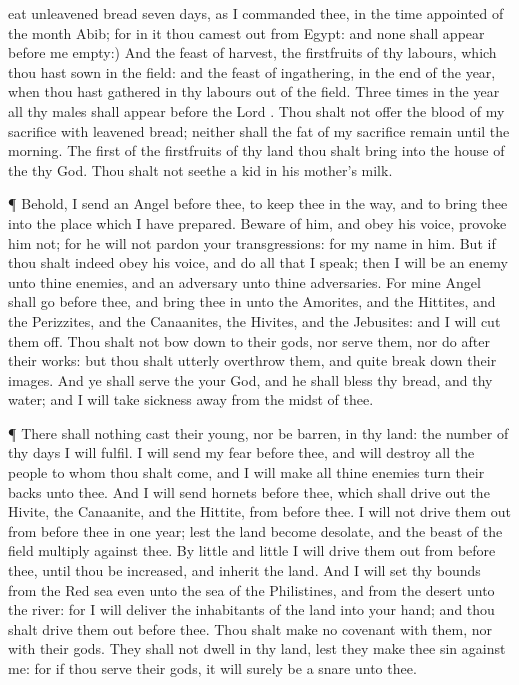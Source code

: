 {eat unleavened
bread
seven
days, as I
commanded thee, in the time
appointed of the
month
Abib; for in it thou camest
out from
Egypt: and none shall
appear
before me
empty:)
And the
feast of
harvest, the
firstfruits of thy
labours, which thou hast
sown in the
field: and the
feast of
ingathering,
{} in the
end of the
year, when thou hast
gathered in thy
labours out of the
field.
Three
times in the
year all thy
males shall
appear
before the
Lord
{}.
Thou shalt not
offer the
blood of my
sacrifice with leavened
bread; neither shall the
fat of my
sacrifice
remain until the
morning.
The
first of the
firstfruits of thy
land thou shalt
bring into the
house of the
{} thy
God. Thou shalt not
seethe a
kid in his
mother’s
milk.
\par }{\PP {}¶ Behold, I
send an
Angel
before thee, to
keep thee in the
way, and to
bring thee into the
place which I have
prepared.
Beware
of him, and
obey his
voice,
provoke him not; for he will not
pardon your
transgressions: for my
name
{} in
him.
But if thou shalt
indeed
obey his
voice, and
do all that I
speak; then I will be an
enemy unto thine
enemies, and an
adversary unto thine
adversaries.
For mine
Angel shall
go
before thee, and
bring thee in unto the
Amorites, and the
Hittites, and the
Perizzites, and the
Canaanites, the
Hivites, and the
Jebusites: and I will cut them
off.
Thou shalt not bow
down to their
gods, nor
serve them, nor
do after their
works: but thou shalt
utterly
overthrow them, and
quite break
down their
images.
And ye shall
serve the
{} your
God, and he shall
bless thy
bread, and thy
water; and I will
take
sickness
away from the
midst of thee.
\par }{\PP {}¶ There shall nothing cast their
young, nor be
barren, in thy
land: the
number of thy
days I will
fulfil.
I will
send my
fear
before thee, and will
destroy all the
people to whom thou shalt
come, and I will
make all thine
enemies turn their
backs unto thee.
And I will
send
hornets
before thee, which shall drive
out the
Hivite, the
Canaanite, and the
Hittite, from
before thee.
I will not drive them
out from
before thee in
one
year; lest the
land become
desolate, and the
beast of the
field
multiply against thee.
By
little and
little I will drive them
out from
before thee, until thou be
increased, and
inherit the
land.
And I will
set thy
bounds from the
Red
sea even unto the
sea of the
Philistines, and from the
desert unto the
river: for I will
deliver the
inhabitants of the
land into your
hand; and thou shalt drive them
out
before thee.
Thou shalt
make no
covenant with them, nor with their
gods.
They shall not
dwell in thy
land, lest they make thee
sin against me: for if thou
serve their
gods, it will surely be a
snare unto thee.

}
